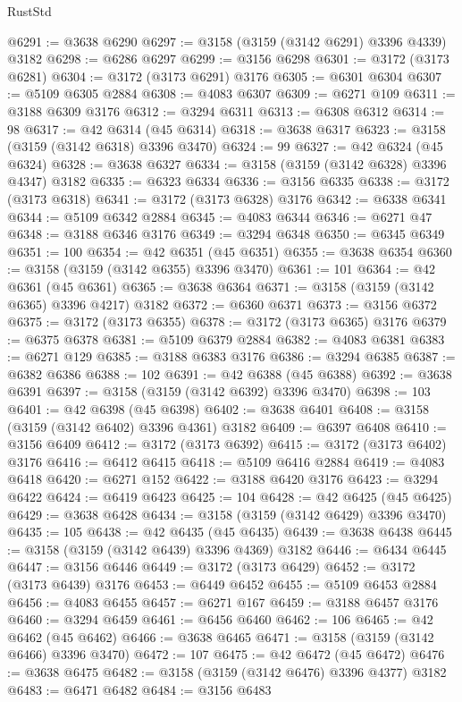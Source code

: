 \begin{lexlean}{RustStd}
\begin{coremodule}
@6291 := @3638 @6290
@6297 := @3158 (@3159 (@3142 @6291) @3396 @4339) @3182
@6298 := @6286 @6297
@6299 := @3156 @6298
@6301 := @3172 (@3173 @6281)
@6304 := @3172 (@3173 @6291) @3176
@6305 := @6301 @6304
@6307 := @5109 @6305 @2884
@6308 := @4083 @6307
@6309 := @6271 @109
@6311 := @3188 @6309 @3176
@6312 := @3294 @6311
@6313 := @6308 @6312
@6314 := 98
@6317 := @42 @6314 (@45 @6314)
@6318 := @3638 @6317
@6323 := @3158 (@3159 (@3142 @6318) @3396 @3470)
@6324 := 99
@6327 := @42 @6324 (@45 @6324)
@6328 := @3638 @6327
@6334 := @3158 (@3159 (@3142 @6328) @3396 @4347) @3182
@6335 := @6323 @6334
@6336 := @3156 @6335
@6338 := @3172 (@3173 @6318)
@6341 := @3172 (@3173 @6328) @3176
@6342 := @6338 @6341
@6344 := @5109 @6342 @2884
@6345 := @4083 @6344
@6346 := @6271 @47
@6348 := @3188 @6346 @3176
@6349 := @3294 @6348
@6350 := @6345 @6349
@6351 := 100
@6354 := @42 @6351 (@45 @6351)
@6355 := @3638 @6354
@6360 := @3158 (@3159 (@3142 @6355) @3396 @3470)
@6361 := 101
@6364 := @42 @6361 (@45 @6361)
@6365 := @3638 @6364
@6371 := @3158 (@3159 (@3142 @6365) @3396 @4217) @3182
@6372 := @6360 @6371
@6373 := @3156 @6372
@6375 := @3172 (@3173 @6355)
@6378 := @3172 (@3173 @6365) @3176
@6379 := @6375 @6378
@6381 := @5109 @6379 @2884
@6382 := @4083 @6381
@6383 := @6271 @129
@6385 := @3188 @6383 @3176
@6386 := @3294 @6385
@6387 := @6382 @6386
@6388 := 102
@6391 := @42 @6388 (@45 @6388)
@6392 := @3638 @6391
@6397 := @3158 (@3159 (@3142 @6392) @3396 @3470)
@6398 := 103
@6401 := @42 @6398 (@45 @6398)
@6402 := @3638 @6401
@6408 := @3158 (@3159 (@3142 @6402) @3396 @4361) @3182
@6409 := @6397 @6408
@6410 := @3156 @6409
@6412 := @3172 (@3173 @6392)
@6415 := @3172 (@3173 @6402) @3176
@6416 := @6412 @6415
@6418 := @5109 @6416 @2884
@6419 := @4083 @6418
@6420 := @6271 @152
@6422 := @3188 @6420 @3176
@6423 := @3294 @6422
@6424 := @6419 @6423
@6425 := 104
@6428 := @42 @6425 (@45 @6425)
@6429 := @3638 @6428
@6434 := @3158 (@3159 (@3142 @6429) @3396 @3470)
@6435 := 105
@6438 := @42 @6435 (@45 @6435)
@6439 := @3638 @6438
@6445 := @3158 (@3159 (@3142 @6439) @3396 @4369) @3182
@6446 := @6434 @6445
@6447 := @3156 @6446
@6449 := @3172 (@3173 @6429)
@6452 := @3172 (@3173 @6439) @3176
@6453 := @6449 @6452
@6455 := @5109 @6453 @2884
@6456 := @4083 @6455
@6457 := @6271 @167
@6459 := @3188 @6457 @3176
@6460 := @3294 @6459
@6461 := @6456 @6460
@6462 := 106
@6465 := @42 @6462 (@45 @6462)
@6466 := @3638 @6465
@6471 := @3158 (@3159 (@3142 @6466) @3396 @3470)
@6472 := 107
@6475 := @42 @6472 (@45 @6472)
@6476 := @3638 @6475
@6482 := @3158 (@3159 (@3142 @6476) @3396 @4377) @3182
@6483 := @6471 @6482
@6484 := @3156 @6483

\end{coremodule}
\end{lexlean}
